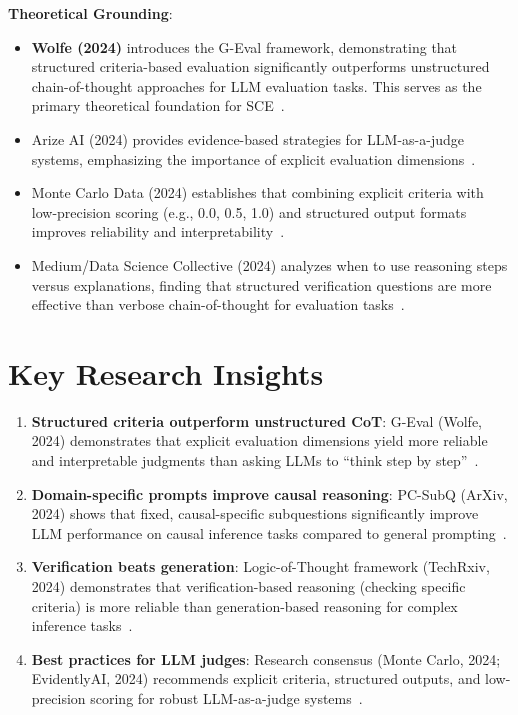 \documentclass[11pt]{article}
\begin{document}
\textbf{Theoretical Grounding}:
\begin{itemize}[noitemsep]
    \item \textbf{Wolfe (2024)} introduces the G-Eval framework, demonstrating that structured criteria-based evaluation significantly outperforms unstructured chain-of-thought approaches for LLM evaluation tasks. This serves as the primary theoretical foundation for SCE~\cite{wolfe2024geval}.
    \item Arize AI (2024) provides evidence-based strategies for LLM-as-a-judge systems, emphasizing the importance of explicit evaluation dimensions~\cite{arizeai2024}.
    \item Monte Carlo Data (2024) establishes that combining explicit criteria with low-precision scoring (e.g., 0.0, 0.5, 1.0) and structured output formats improves reliability and interpretability~\cite{montecarlo2024}.
    \item Medium/Data Science Collective (2024) analyzes when to use reasoning steps versus explanations, finding that structured verification questions are more effective than verbose chain-of-thought for evaluation tasks~\cite{medium2024}.
\end{itemize}

\section{Key Research Insights}

\begin{enumerate}
    \item \textbf{Structured criteria outperform unstructured CoT}: G-Eval (Wolfe, 2024) demonstrates that explicit evaluation dimensions yield more reliable and interpretable judgments than asking LLMs to ``think step by step''~\cite{wolfe2024geval}.
    
    \item \textbf{Domain-specific prompts improve causal reasoning}: PC-SubQ (ArXiv, 2024) shows that fixed, causal-specific subquestions significantly improve LLM performance on causal inference tasks compared to general prompting~\cite{arxiv2024pcsubq}.
    
    \item \textbf{Verification beats generation}: Logic-of-Thought framework (TechRxiv, 2024) demonstrates that verification-based reasoning (checking specific criteria) is more reliable than generation-based reasoning for complex inference tasks~\cite{techrxiv2024}.
    
    \item \textbf{Best practices for LLM judges}: Research consensus (Monte Carlo, 2024; EvidentlyAI, 2024) recommends explicit criteria, structured outputs, and low-precision scoring for robust LLM-as-a-judge systems~\cite{montecarlo2024,evidentlyai2024}.
\end{enumerate}
\end{document}
